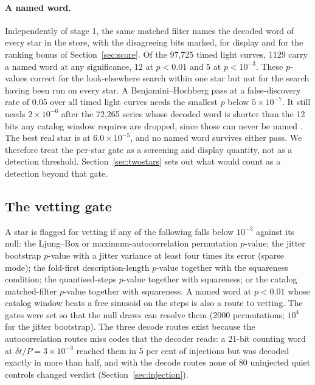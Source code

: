 \documentclass[final,5p]{elsarticle}
\newcommand{\dtp}{\ensuremath{\delta t/P}}
\begin{document}
\paragraph{A named word.} Independently of stage 1, the same matched filter names the decoded word of every star in the store, with the disagreeing bits marked, for display and for the ranking bonus of Section~\ref{sec:score}. Of the 97{,}725 timed light curves, 1129 carry a named word at any significance, 12 at $p<0.01$ and 5 at $p<10^{-3}$. These $p$-values correct for the look-elsewhere search within one star but not for the search having been run on every star. A Benjamini--Hochberg pass \citep{Benjamini1995} at a false-discovery rate of 0.05 over all timed light curves needs the smallest $p$ below $5\times10^{-7}$. It still needs $2\times10^{-6}$ after the 72{,}265 series whose decoded word is shorter than the 12 bits any catalog window requires are dropped, since those can never be named \citep[Tarone's reduction]{Tarone1990}. The best real star is at $6.0\times10^{-5}$, and no named word survives either pass. We therefore treat the per-star gate as a screening and display quantity, not as a detection threshold. Section~\ref{sec:twostars} sets out what would count as a detection beyond that gate.

\subsection{The vetting gate}
\label{sec:triage}

A star is flagged for vetting if any of the following falls below $10^{-3}$ against its null: the Ljung--Box or maximum-autocorrelation permutation $p$-value; the jitter bootstrap $p$-value with a jitter variance at least four times its error (sparse mode); the fold-first description-length $p$-value together with the squareness condition; the quantised-steps $p$-value together with squareness; or the catalog matched-filter $p$-value together with squareness. A named word at $p<0.01$ whose catalog window beats a free sinusoid on the steps is also a route to vetting. The gates were set so that the null draws can resolve them (2000 permutations; $10^4$ for the jitter bootstrap). The three decode routes exist because the autocorrelation routes miss codes that the decoder reads: a 21-bit counting word at $\dtp=3\times10^{-3}$ reached them in 5 per cent of injections but was decoded exactly in more than half, and with the decode routes none of 80 uninjected quiet controls changed verdict (Section~\ref{sec:injection}).
\end{document}
